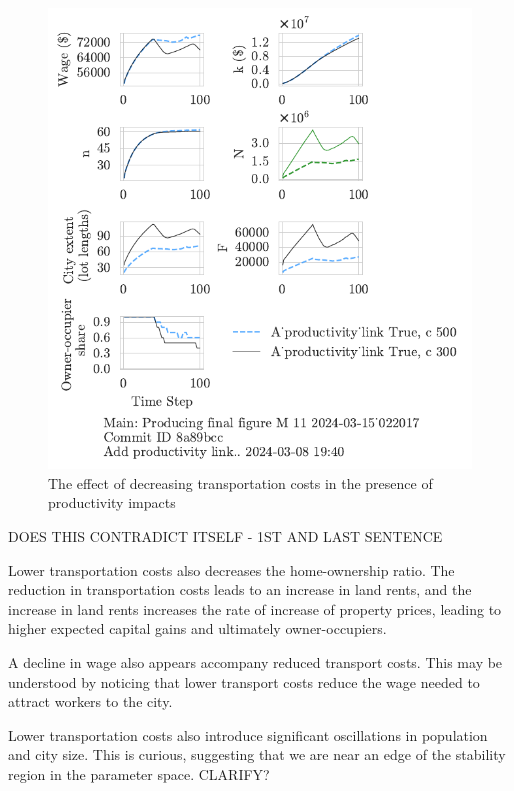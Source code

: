 \begin{figure}[h!t]
    \centering
    \includegraphics[scale=1, trim={0 1.4cm 0 0},clip]{fig/With-productivity_link-c-15_022017.pdf}
    \caption{The effect of decreasing transportation costs in the presence of productivity impacts}
    \label{fig:Productivity_link_and_c_ownership_trajectory}
\end{figure}

{\color{red} DOES THIS CONTRADICT ITSELF - 1ST AND LAST SENTENCE}

Lower transportation costs also decreases the home-ownership ratio. The reduction in transportation costs leads to an increase in land rents, and the increase in land rents increases the rate of increase of property prices, leading to higher expected capital gains and ultimately owner-occupiers. 

A decline in wage also appears accompany reduced transport costs. This may be understood by noticing that lower transport costs reduce the wage needed to attract workers to the city. 

Lower transportation costs also introduce significant oscillations in population and city size. This is curious, suggesting that we are near an edge of the stability region in the parameter space. CLARIFY?



